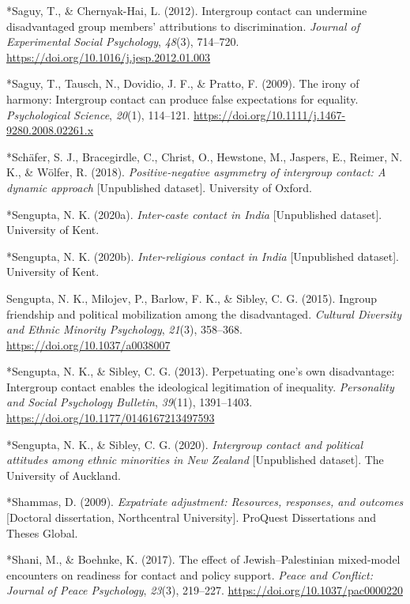 \documentclass[12pt, letterpaper]{article}
\begin{document}
\leavevmode\hypertarget{ref-4005}{}%
*Saguy, T., \& Chernyak-Hai, L. (2012). Intergroup contact can undermine
disadvantaged group members' attributions to discrimination.
\emph{Journal of Experimental Social Psychology}, \emph{48}(3),
714--720. \url{https://doi.org/10.1016/j.jesp.2012.01.003}

\leavevmode\hypertarget{ref-813}{}%
*Saguy, T., Tausch, N., Dovidio, J. F., \& Pratto, F. (2009). The irony
of harmony: Intergroup contact can produce false expectations for
equality. \emph{Psychological Science}, \emph{20}(1), 114--121.
\url{https://doi.org/10.1111/j.1467-9280.2008.02261.x}

\leavevmode\hypertarget{ref-2382}{}%
*Schäfer, S. J., Bracegirdle, C., Christ, O., Hewstone, M., Jaspers, E.,
Reimer, N. K., \& Wölfer, R. (2018). \emph{Positive-negative asymmetry
of intergroup contact: A dynamic approach} {[}Unpublished dataset{]}.
University of Oxford.

\leavevmode\hypertarget{ref-2392}{}%
*Sengupta, N. K. (2020a). \emph{Inter-caste contact in India}
{[}Unpublished dataset{]}. University of Kent.

\leavevmode\hypertarget{ref-2385}{}%
*Sengupta, N. K. (2020b). \emph{Inter-religious contact in India}
{[}Unpublished dataset{]}. University of Kent.

\leavevmode\hypertarget{ref-sengupta_ingroup_2015}{}%
Sengupta, N. K., Milojev, P., Barlow, F. K., \& Sibley, C. G. (2015).
Ingroup friendship and political mobilization among the disadvantaged.
\emph{Cultural Diversity and Ethnic Minority Psychology}, \emph{21}(3),
358--368. \url{https://doi.org/10.1037/a0038007}

\leavevmode\hypertarget{ref-1695}{}%
*Sengupta, N. K., \& Sibley, C. G. (2013). Perpetuating one's own
disadvantage: Intergroup contact enables the ideological legitimation of
inequality. \emph{Personality and Social Psychology Bulletin},
\emph{39}(11), 1391--1403.
\url{https://doi.org/10.1177/0146167213497593}

\leavevmode\hypertarget{ref-2381}{}%
*Sengupta, N. K., \& Sibley, C. G. (2020). \emph{Intergroup contact and
political attitudes among ethnic minorities in New Zealand}
{[}Unpublished dataset{]}. The University of Auckland.

\leavevmode\hypertarget{ref-1891}{}%
*Shammas, D. (2009). \emph{Expatriate adjustment: Resources, responses,
and outcomes} {[}Doctoral dissertation, Northcentral University{]}.
ProQuest Dissertations and Theses Global.

\leavevmode\hypertarget{ref-789}{}%
*Shani, M., \& Boehnke, K. (2017). The effect of Jewish--Palestinian
mixed-model encounters on readiness for contact and policy support.
\emph{Peace and Conflict: Journal of Peace Psychology}, \emph{23}(3),
219--227. \url{https://doi.org/10.1037/pac0000220}
\end{document}
